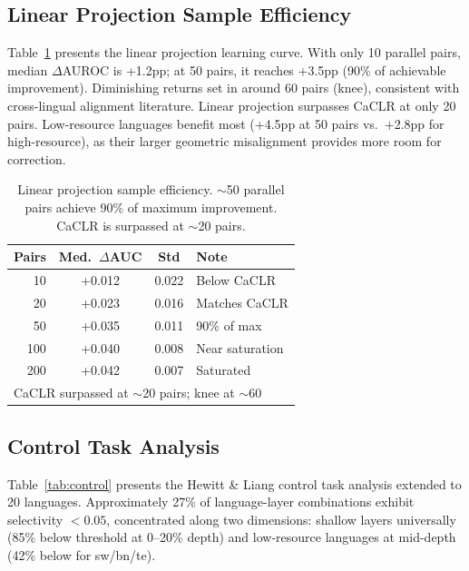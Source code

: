 \documentclass[11pt,a4paper]{article}
\begin{document}
\subsection{Linear Projection Sample Efficiency}
\label{sec:linproj}

Table~\ref{tab:linproj} presents the linear projection learning curve.
With only 10 parallel pairs, median $\Delta$AUROC is +1.2pp; at 50 pairs, it reaches +3.5pp (90\% of achievable improvement).
Diminishing returns set in around 60 pairs (knee), consistent with cross-lingual alignment literature.
Linear projection surpasses CaCLR at only 20 pairs.
Low-resource languages benefit most (+4.5pp at 50 pairs vs.\ +2.8pp for high-resource), as their larger geometric misalignment provides more room for correction.

\begin{table}[t]
\centering
\small
\begin{tabular}{rccl}
\toprule
\textbf{Pairs} & \textbf{Med.\ $\Delta$AUC} & \textbf{Std} & \textbf{Note} \\
\midrule
10 & +0.012 & 0.022 & Below CaCLR \\
20 & +0.023 & 0.016 & Matches CaCLR \\
50 & +0.035 & 0.011 & 90\% of max \\
100 & +0.040 & 0.008 & Near saturation \\
200 & +0.042 & 0.007 & Saturated \\
\midrule
\multicolumn{4}{l}{\small CaCLR surpassed at ${\sim}$20 pairs; knee at ${\sim}$60} \\
\bottomrule
\end{tabular}
\caption{Linear projection sample efficiency. $\sim$50 parallel pairs achieve 90\% of maximum improvement. CaCLR is surpassed at $\sim$20 pairs.}
\label{tab:linproj}
\end{table}

\subsection{Control Task Analysis}
\label{sec:control}

Table~\ref{tab:control} presents the Hewitt \& Liang control task analysis extended to 20 languages.
Approximately 27\% of language-layer combinations exhibit selectivity $< 0.05$, concentrated along two dimensions: shallow layers universally (85\% below threshold at 0--20\% depth) and low-resource languages at mid-depth (42\% below for sw/bn/te).
\end{document}
